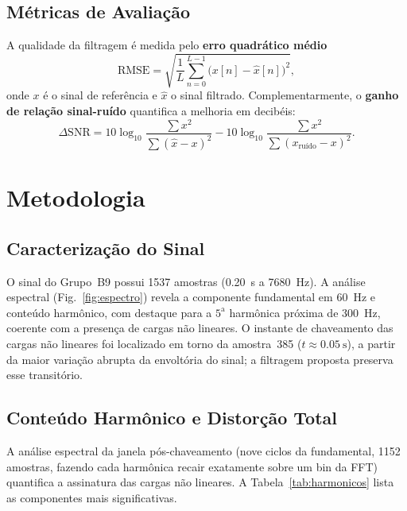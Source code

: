 \documentclass[conference]{IEEEtran}
\begin{document}
\subsection{Métricas de Avaliação}
A qualidade da filtragem é medida pelo \textbf{erro quadrático médio}
\begin{equation}
\mathrm{RMSE} = \sqrt{\frac{1}{L}\sum_{n=0}^{L-1}
\bigl(x[n] - \hat{x}[n]\bigr)^2},
\label{eq:rmse}
\end{equation}
onde $x$ é o sinal de referência e $\hat{x}$ o sinal filtrado. Complementarmente,
o \textbf{ganho de relação sinal-ruído} quantifica a melhoria em decibéis:
\begin{equation}
\Delta\mathrm{SNR} = 10\log_{10}\!\frac{\sum x^2}{\sum (\hat{x}-x)^2}
                   - 10\log_{10}\!\frac{\sum x^2}{\sum (x_{\text{ruído}}-x)^2}.
\label{eq:snr}
\end{equation}

\section{Metodologia}
\label{sec:metodo}

\subsection{Caracterização do Sinal}
O sinal do Grupo~B9 possui \num{1537} amostras (\SI{0.20}{\second} a
\SI{7680}{\hertz}). A análise espectral (Fig.~\ref{fig:espectro}) revela a
componente fundamental em \SI{60}{\hertz} e conteúdo harmônico, com destaque para
a $5^{\text{a}}$ harmônica próxima de \SI{300}{\hertz}, coerente com a presença de
cargas não lineares. O instante de chaveamento das cargas não lineares foi
localizado em torno da amostra~385 ($t \approx \SI{0.05}{\second}$), a partir da
maior variação abrupta da envoltória do sinal; a filtragem proposta preserva esse
transitório.

\subsection{Conteúdo Harmônico e Distorção Total}
A análise espectral da janela pós-chaveamento (nove ciclos da fundamental,
\num{1152} amostras, fazendo cada harmônica recair exatamente sobre um bin da
FFT) quantifica a assinatura das cargas não lineares. A
Tabela~\ref{tab:harmonicos} lista as componentes mais significativas.
\end{document}
